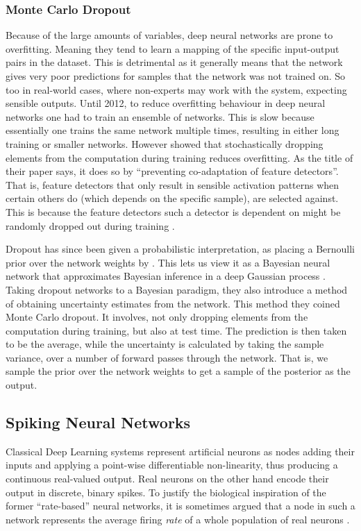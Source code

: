 \documentclass[10pt,a4paper,twocolumn]{article}
\begin{document}
\subsubsection{Monte Carlo Dropout}
Because of the large amounts of variables, deep neural networks are prone to overfitting. Meaning they tend to learn a mapping of the specific input-output pairs in the dataset. This is detrimental as it generally means that the network gives very poor predictions for samples that the network was not trained on. So too in real-world cases, where non-experts may work with the system, expecting sensible outputs. Until 2012, to reduce overfitting behaviour in deep neural networks one had to train an ensemble of networks. This is slow because essentially one trains the same network multiple times, resulting in either long training or smaller networks. However  showed that stochastically dropping elements from the computation during training reduces overfitting. As the title of their paper says, it does so by ``preventing co-adaptation of feature detectors''. That is, feature detectors that only result in sensible activation patterns when certain others do (which depends on the specific sample), are selected against. This is because the feature detectors such a detector is dependent on might be randomly dropped out during training \cite{srivastava2014dropout}.

Dropout has since been given a probabilistic interpretation, as placing a Bernoulli prior over the network weights by . This lets us view it as a Bayesian neural network that approximates Bayesian inference in a deep Gaussian process \cite{gal2016dropout}. Taking dropout networks to a Bayesian paradigm, they also introduce a method of obtaining uncertainty estimates from the network. This method they coined Monte Carlo dropout. It involves, not only dropping elements from the computation during training, but also at test time. The prediction is then taken to be the average, while the uncertainty is calculated by taking the sample variance, over a number of forward passes through the network.
That is, we sample the prior over the network weights to get a sample of the posterior as the output.

\subsection{Spiking Neural Networks}
Classical Deep Learning systems represent artificial neurons as nodes adding their inputs and applying a point-wise differentiable non-linearity, thus producing a continuous real-valued output. Real neurons on the other hand encode their output in discrete, binary spikes. To justify the biological inspiration of the former ``rate-based'' neural networks, it is sometimes argued that a node in such a network represents the average firing \emph{rate} of a whole population of real neurons \cite{rolls1998neural}. 
\end{document}
